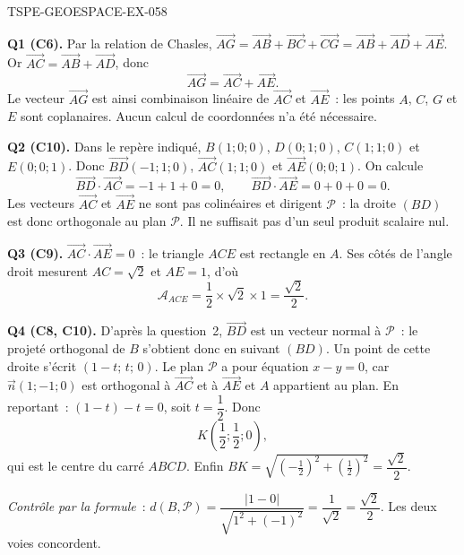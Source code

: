 \begin{corrige}{TSPE-GEOESPACE-EX-058}

\textbf{Q1 (C6).} Par la relation de Chasles,
$\vec{AG}=\vec{AB}+\vec{BC}+\vec{CG}=\vec{AB}+\vec{AD}+\vec{AE}$. Or
$\vec{AC}=\vec{AB}+\vec{AD}$, donc
\[
  \vec{AG}=\vec{AC}+\vec{AE}.
\]
Le vecteur $\vec{AG}$ est ainsi combinaison linéaire de $\vec{AC}$ et
$\vec{AE}$~: les points $A$, $C$, $G$ et $E$ sont coplanaires. Aucun calcul de
coordonnées n'a été nécessaire.

\textbf{Q2 (C10).} Dans le repère indiqué, $B(1;0;0)$, $D(0;1;0)$, $C(1;1;0)$
et $E(0;0;1)$. Donc $\vec{BD}(-1;1;0)$, $\vec{AC}(1;1;0)$ et
$\vec{AE}(0;0;1)$. On calcule
\[
  \vec{BD}\cdot\vec{AC}=-1+1+0=0,
  \qquad
  \vec{BD}\cdot\vec{AE}=0+0+0=0 .
\]
Les vecteurs $\vec{AC}$ et $\vec{AE}$ ne sont pas colinéaires et dirigent
$\mathcal{P}$~: la droite $(BD)$ est donc orthogonale au plan $\mathcal{P}$.
Il ne suffisait pas d'un seul produit scalaire nul.

\textbf{Q3 (C9).} $\vec{AC}\cdot\vec{AE}=0$~: le triangle $ACE$ est rectangle
en $A$. Ses côtés de l'angle droit mesurent $AC=\sqrt{2}$ et $AE=1$, d'où
\[
  \mathcal{A}_{ACE}=\frac12\times\sqrt2\times1=\frac{\sqrt2}{2}.
\]

\textbf{Q4 (C8, C10).} D'après la question~2, $\vec{BD}$ est un vecteur normal
à $\mathcal{P}$~: le projeté orthogonal de $B$ s'obtient donc en suivant
$(BD)$. Un point de cette droite s'écrit $(1-t;\,t;\,0)$. Le plan
$\mathcal{P}$ a pour équation $x-y=0$, car $\vec{n}(1;-1;0)$ est orthogonal à
$\vec{AC}$ et à $\vec{AE}$ et $A$ appartient au plan. En reportant~:
$(1-t)-t=0$, soit $t=\dfrac12$. Donc
\[
  K\left(\frac12;\frac12;0\right),
\]
qui est le centre du carré $ABCD$. Enfin
$BK=\sqrt{\left(-\frac12\right)^2+\left(\frac12\right)^2}=\dfrac{\sqrt2}{2}$.

\emph{Contrôle par la formule}~:
$d(B,\mathcal{P})=\dfrac{\lvert 1-0\rvert}{\sqrt{1^2+(-1)^2}}
=\dfrac{1}{\sqrt2}=\dfrac{\sqrt2}{2}$. Les deux voies concordent.

\end{corrige}

